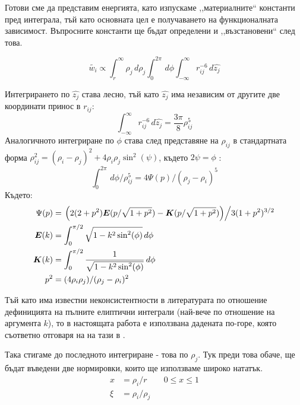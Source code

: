 Готови сме да представим енергията, като изпускаме ,,материалните`` константи пред интеграла, тъй като основната цел е получаването на функционалната зависимост. Въпросните константи ще бъдат
определени и ,,възстановени`` след това.

\begin{equation}
    \label{eq:energy_integral_raw}
    \tilde{w_i} \displaystyle\propto \displaystyle\int_{r}^{\infty} \rho_{j} \,d\rho_{j} \displaystyle\int_{0}^{2\pi} \,d\phi \displaystyle\int_{-\infty}^{\infty} r_{ij}^{-6} \,d\hat{z_{j}}
\end{equation}

Интегрирането по $\hat{z_j}$ става лесно, тъй като $\hat{z_{j}}$ има независим от другите две координати принос в $r_{ij}$:
\begin{equation*}
    \displaystyle\int_{-\infty}^{\infty} r_{ij}^{-6} \,d\hat{z_{j}} = \frac{3\pi}{8} \rho_{ij}^5
\end{equation*}
Аналогичното интегриране по $\phi$ става след представяне на $\rho_{ij}$ в стандартната форма $\rho_{ij}^2 = (\rho_i - \rho_j)^2 + 4 \rho_i \rho_j \sin^2(\psi)$, където $2\psi=\phi$ \cite{gradshteyn}:
\begin{equation*}
    \displaystyle\int_{0}^{2\pi} \,d\phi/\rho_{ij}^5 = 4\Psi(p)/(\rho_j-\rho_i)^5
\end{equation*} 
Където:
\begin{align*}
    \Psi(p) &= \left. \left(2(2+p^2)\boldsymbol{E}(p/\sqrt{1+p^2}) - \boldsymbol{K}(p/\sqrt{1+p^2})\right)\middle/3(1+p^2)^{3/2}\right. \\
    \boldsymbol{E}(k) &= \displaystyle\int_{0}^{\pi/2} \sqrt{1-k^2 \sin^2(\phi)} \,d\phi \\
    \boldsymbol{K}(k) &= \displaystyle\int_{0}^{\pi/2} \frac{1}{\sqrt{1-k^2 \sin^2(\phi)}} \,d\phi \\
    p^2 &= (4 \rho_i \rho_j)/(\rho_j - \rho_i)^2
\end{align*}

Тъй като има известни неконсистентности в литературата по отношение дефиницията на пълните елиптични интеграли (най-вече по отношение на аргумента $k$), то в настоящата работа е използвана дадената по-горе, която съответно отговаря на на тази в \cite{gradshteyn}.

Така стигаме до последното интегриране - това по $\rho_j$. Тук преди това обаче, ще бъдат въведени две нормировки, които ще използваме широко нататък.
\begin{align*}
    x &= \rho_i/r && 0 \le x \le 1 \\
    \xi &= \rho_i/\rho_j
\end{align*}

